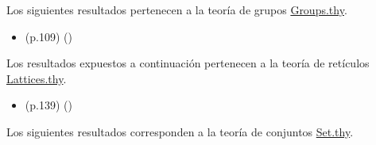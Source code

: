 \begin{isabellebody}
%
\isadelimdocument
%
\endisadelimdocument
%
\isatagdocument
%
\isamarkuptrue%
%
\endisatagdocument
{\isafolddocument}%
%
\isadelimdocument
%
\endisadelimdocument
%
\begin{isamarkuptext}%
Los siguientes resultados pertenecen a la teoría de 
  grupos \href{https://bit.ly/3fwjIPe}{Groups.thy}.%
\end{isamarkuptext}\isamarkuptrue%
%
\isadelimdocument
%
\endisadelimdocument
%
\isatagdocument
%
\isamarkuptrue%
%
\endisatagdocument
{\isafolddocument}%
%
\isadelimdocument
%
\endisadelimdocument
%
\begin{isamarkuptext}%
\begin{itemize}
    \item (p.109)  
      \hfill ()
  \end{itemize}%
\end{isamarkuptext}\isamarkuptrue%
%
\isadelimdocument
%
\endisadelimdocument
%
\isatagdocument
%
\isamarkuptrue%
%
\endisatagdocument
{\isafolddocument}%
%
\isadelimdocument
%
\endisadelimdocument
%
\begin{isamarkuptext}%
Los resultados expuestos a continuación pertenecen a la teoría de 
  retículos \href{https://bit.ly/2N4lbjn}{Lattices.thy}.%
\end{isamarkuptext}\isamarkuptrue%
%
\begin{isamarkuptext}%
\begin{itemize}
    \item (p.139)  
      \hfill ()
  \end{itemize}%
\end{isamarkuptext}\isamarkuptrue%
%
\isadelimdocument
%
\endisadelimdocument
%
\isatagdocument
%
\isamarkuptrue%
%
\endisatagdocument
{\isafolddocument}%
%
\isadelimdocument
%
\endisadelimdocument
%
\begin{isamarkuptext}%
Los siguientes resultados corresponden a la teoría de conjuntos 
  \href{https://bit.ly/3ePFv4B}{Set.thy}.%
\end{isamarkuptext}\isamarkuptrue%

\end{isabellebody}
